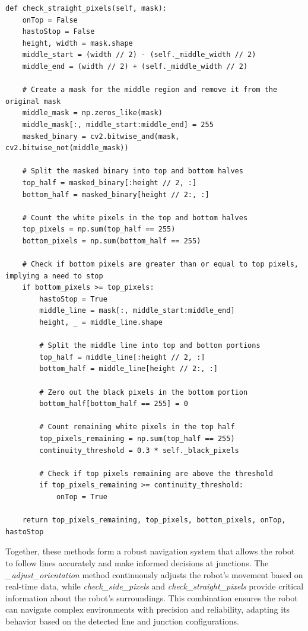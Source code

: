\documentclass[a4paper,12pt]{extreport}
\begin{document}
\newpage
\begin{verbatim}
def check_straight_pixels(self, mask):
    onTop = False
    hastoStop = False
    height, width = mask.shape
    middle_start = (width // 2) - (self._middle_width // 2)
    middle_end = (width // 2) + (self._middle_width // 2)
    
    # Create a mask for the middle region and remove it from the original mask
    middle_mask = np.zeros_like(mask)
    middle_mask[:, middle_start:middle_end] = 255 
    masked_binary = cv2.bitwise_and(mask, cv2.bitwise_not(middle_mask))

    # Split the masked binary into top and bottom halves
    top_half = masked_binary[:height // 2, :]
    bottom_half = masked_binary[height // 2:, :]

    # Count the white pixels in the top and bottom halves
    top_pixels = np.sum(top_half == 255)
    bottom_pixels = np.sum(bottom_half == 255)

    # Check if bottom pixels are greater than or equal to top pixels, implying a need to stop
    if bottom_pixels >= top_pixels:
        hastoStop = True
        middle_line = mask[:, middle_start:middle_end]
        height, _ = middle_line.shape
        
        # Split the middle line into top and bottom portions
        top_half = middle_line[:height // 2, :]
        bottom_half = middle_line[height // 2:, :]

        # Zero out the black pixels in the bottom portion
        bottom_half[bottom_half == 255] = 0
        
        # Count remaining white pixels in the top half
        top_pixels_remaining = np.sum(top_half == 255)
        continuity_threshold = 0.3 * self._black_pixels
        
        # Check if top pixels remaining are above the threshold
        if top_pixels_remaining >= continuity_threshold:
            onTop = True

    return top_pixels_remaining, top_pixels, bottom_pixels, onTop, hastoStop

\end{verbatim}
\label{judeFig30}

Together, these methods form a robust navigation system that allows the
robot to follow lines accurately and make informed decisions at
junctions. The \emph{\_adjust\_orientation} method continuously adjusts
the robot's movement based on real-time data, while
\emph{check\_side\_pixels} and \emph{check\_straight\_pixels} provide
critical information about the robot's surroundings. This combination
ensures the robot can navigate complex environments with precision and
reliability, adapting its behavior based on the detected line and
junction configurations.
\end{document}

